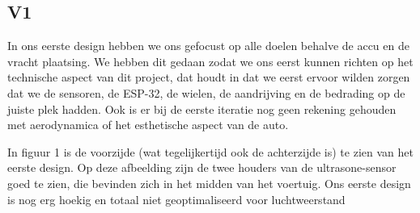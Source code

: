 \subsection{V1}

In ons eerste design hebben we ons gefocust op alle doelen behalve de accu en de vracht plaatsing. We hebben dit gedaan zodat we ons eerst kunnen richten op het technische aspect van dit project, dat houdt in dat we eerst ervoor wilden zorgen dat we de sensoren, de ESP-32, de wielen, de aandrijving en de bedrading op de juiste plek hadden. Ook is er bij de eerste iteratie nog geen rekening gehouden met aerodynamica of het esthetische aspect van de auto.


In figuur 1 is de voorzijde (wat tegelijkertijd ook de achterzijde is) te zien van het eerste design. Op deze afbeelding zijn de twee houders van de ultrasone-sensor goed te zien, die bevinden zich in het midden van het voertuig. Ons eerste design is nog erg hoekig en totaal niet geoptimaliseerd voor luchtweerstand
